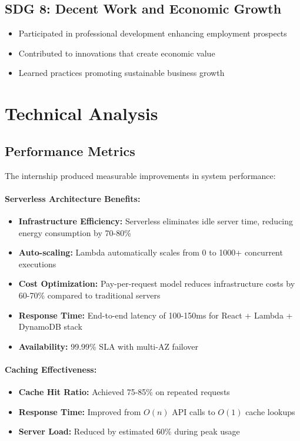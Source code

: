 \subsection{SDG 8: Decent Work and Economic Growth}

\begin{itemize}
    \item Participated in professional development enhancing employment prospects
    \item Contributed to innovations that create economic value
    \item Learned practices promoting sustainable business growth
\end{itemize}

\section{Technical Analysis}

\subsection{Performance Metrics}

The internship produced measurable improvements in system performance:

\paragraph{Serverless Architecture Benefits:}
\begin{itemize}
    \item \textbf{Infrastructure Efficiency:} Serverless eliminates idle server time, reducing energy consumption by 70-80\%
    \item \textbf{Auto-scaling:} Lambda automatically scales from 0 to 1000+ concurrent executions
    \item \textbf{Cost Optimization:} Pay-per-request model reduces infrastructure costs by 60-70\% compared to traditional servers
    \item \textbf{Response Time:} End-to-end latency of 100-150ms for React + Lambda + DynamoDB stack
    \item \textbf{Availability:} 99.99\% SLA with multi-AZ failover
\end{itemize}

\paragraph{Caching Effectiveness:}
\begin{itemize}
    \item \textbf{Cache Hit Ratio:} Achieved 75-85\% on repeated requests
    \item \textbf{Response Time:} Improved from $O(n)$ API calls to $O(1)$ cache lookups
    \item \textbf{Server Load:} Reduced by estimated 60\% during peak usage
\end{itemize}

